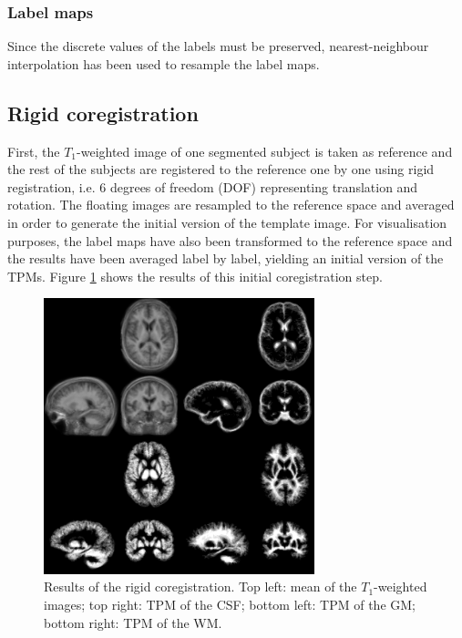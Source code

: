 \subsubsection{Label maps} Since the discrete values of the labels must be preserved, nearest-neighbour interpolation has been used to resample the label maps.



\subsection{Rigid coregistration}
First, the $T_1$-weighted image of one segmented subject is taken as reference and the rest of the subjects are registered to the reference one by one using rigid registration, i.e. 6 degrees of freedom (DOF) representing translation and rotation. The floating images are resampled to the reference space and averaged in order to generate the initial version of the template image. For visualisation purposes, the label maps have also been transformed to the reference space and the results have been averaged label by label, yielding an initial version of the TPMs. Figure \ref{fig:template-rigid} shows the results of this initial coregistration step.

\begin{figure}
  \centering
  \includegraphics[width=0.7\textwidth]{figures/rigid_template_collage}
  \caption{Results of the rigid coregistration. Top left: mean of the $T_1$-weighted images; top right: TPM of the CSF; bottom left: TPM of the GM; bottom right: TPM of the WM.}
  \label{fig:template-rigid}
\end{figure}

